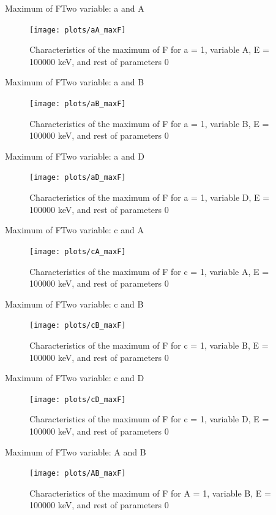 \documentclass{beamer}
\begin{document}
\begin{frame}{Maximum of F}{Two variable: a and A}
	\begin{figure}
		\centering
		\texttt{[image: plots/aA\_maxF]}
		\caption{Characteristics of the maximum of F for a = 1, variable A, E = 100000 keV, and rest of parameters 0}
	\end{figure}
\end{frame}
\begin{frame}{Maximum of F}{Two variable: a and B}
	\begin{figure}
		\centering
		\texttt{[image: plots/aB\_maxF]}
		\caption{Characteristics of the maximum of F for a = 1, variable B, E = 100000 keV, and rest of parameters 0}
	\end{figure}
\end{frame}
\begin{frame}{Maximum of F}{Two variable: a and D}
	\begin{figure}
		\centering
		\texttt{[image: plots/aD\_maxF]}
		\caption{Characteristics of the maximum of F for a = 1, variable D, E = 100000 keV, and rest of parameters 0}
	\end{figure}
\end{frame}
\begin{frame}{Maximum of F}{Two variable: c and A}
	\begin{figure}
		\centering
		\texttt{[image: plots/cA\_maxF]}
		\caption{Characteristics of the maximum of F for c = 1, variable A, E = 100000 keV, and rest of parameters 0}
	\end{figure}
\end{frame}
\begin{frame}{Maximum of F}{Two variable: c and B}
	\begin{figure}
		\centering
		\texttt{[image: plots/cB\_maxF]}
		\caption{Characteristics of the maximum of F for c = 1, variable B, E = 100000 keV, and rest of parameters 0}
	\end{figure}
\end{frame}
\begin{frame}{Maximum of F}{Two variable: c and D}
	\begin{figure}
		\centering
		\texttt{[image: plots/cD\_maxF]}
		\caption{Characteristics of the maximum of F for c = 1, variable D, E = 100000 keV, and rest of parameters 0}
	\end{figure}
\end{frame}
\begin{frame}{Maximum of F}{Two variable: A and B}
	\begin{figure}
		\centering
		\texttt{[image: plots/AB\_maxF]}
		\caption{Characteristics of the maximum of F for A = 1, variable B, E = 100000 keV, and rest of parameters 0}
	\end{figure}
\end{frame}
\end{document}
